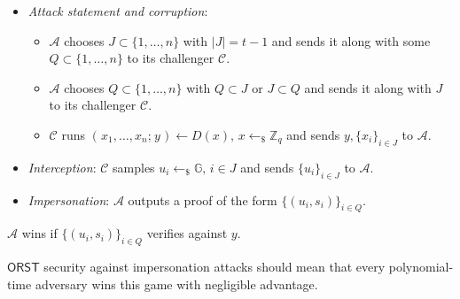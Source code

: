 \documentclass[10pt, psamsfonts, reqno]{amsart}
\theoremstyle{definition}
\theoremstyle{remark}
\numberwithin{equation}{section}
\begin{document}
\begin{itemize}[label=$\bullet$,leftmargin=20pt,rightmargin=0pt]
	\vspace{4pt}
	\item
		\textit{Attack statement and corruption}:
			\begin{itemize}[
				label=$\circ$,leftmargin=17pt,rightmargin=21pt
			]
			\vspace{3pt}
			\item $\mathcal{A}$ chooses $J \subset \{1, \dots, n\}$
				with $|J| = t-1$ and sends it along with some
				$Q \subset \{1, \dots, n\}$
				to its challenger $\mathcal{C}$.
				\vspace{3pt}
			\item $\mathcal{A}$ chooses $Q \subset \{1, \dots, n\}$
				with $Q \subset J$  or $J \subset Q$ and
				sends it along with $J$ to its challenger
				$\mathcal{C}$.
				\vspace{3pt}
			\item $\mathcal{C}$ runs
				$(\hspace{1pt}x_1, \dots, x_n;\hspace{1pt} y\hspace{1pt})
				\leftarrow D(x),\hspace{2pt} x \leftarrow_\$ \mathbb{Z}_q$
				and sends $y, \{x_i\}_{i \in J}$
				to $\mathcal{A}$.
			\vspace{3pt}
			\end{itemize}
	\item
		\textit{Interception}:
		$\mathcal{C}$ samples
		$u_i \leftarrow_\$ \mathbb{G},\hspace{2pt} i \in J$
		and sends $\{u_i\}_{i \in J}$
		to $\mathcal{A}$.\vspace{3pt}
	\item \textit{Impersonation}:
		$\mathcal{A}$ outputs a proof of the form
		$\{(u_i, s_i)\}_{i \in Q}$.
\vspace{4pt}
\end{itemize}
\hspace*{5pt}%
\begin{minipage}{\dimexpr\textwidth-\parindent\relax}%
\hspace{3pt}
$\mathcal{A}$ wins if
$\{(u_i, s_i)\}_{i \in Q}$ verifies against $y$.
\vspace{5pt}
\end{minipage}%

\noindent
$\mathsf{ORST}$ security against impersonation attacks
should mean that every polynomial-time adversary wins this game
with negligible advantage.
\end{document}
